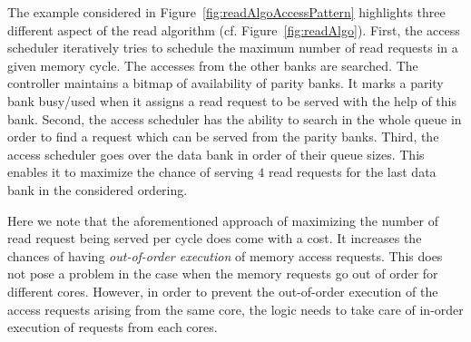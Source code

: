The example considered in Figure~\ref{fig:readAlgoAccessPattern} highlights three different aspect of the read algorithm (cf. Figure~\ref{fig:readAlgo}). {First}, the access scheduler iteratively tries to schedule the maximum number of read requests in a given memory cycle. The accesses from the other banks are searched. The controller maintains a bitmap of availability of parity banks. It marks a parity bank busy/used when it assigns a read request to be served with the help of this bank. {Second}, the access scheduler has the ability to search in the whole queue in order to find a request which can be served from the parity banks. {Third}, the 
access scheduler goes over the data bank in order of their queue sizes. This enables it to maximize the chance of serving $4$ read requests for the last data bank in the considered ordering.
\begin{remark}
Here we note that the aforementioned approach of maximizing the number of read request being served per cycle does come with a cost.  It 
increases the chances of having {\em out-of-order execution} of memory access requests. This does not pose a problem in the case when the memory requests go out of order for different cores. {\color{blue}However, in order to prevent the out-of-order execution of the access requests arising from the same core, the logic needs to take care of in-order execution of requests from each cores.} 
\\
\end{remark}
